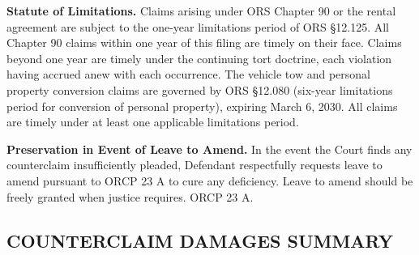 \documentclass[12pt,letterpaper]{article}
\begin{document}
	\textbf{Statute of Limitations.} Claims arising under ORS Chapter 90 or the rental agreement are subject to the one-year limitations period of ORS \S12.125. All Chapter 90 claims within one year of this filing are timely on their face. Claims beyond one year are timely under the continuing tort doctrine, each violation having accrued anew with each occurrence. The vehicle tow and personal property conversion claims are governed by ORS \S12.080 (six-year limitations period for conversion of personal property), expiring March 6, 2030. All claims are timely under at least one applicable limitations period.
	
	\textbf{Preservation in Event of Leave to Amend.} In the event the Court finds any counterclaim insufficiently pleaded, Defendant respectfully requests leave to amend pursuant to ORCP 23 A to cure any deficiency. Leave to amend should be freely granted when justice requires. ORCP 23 A.
	
	\subsection*{COUNTERCLAIM DAMAGES SUMMARY}
	
\end{document}
